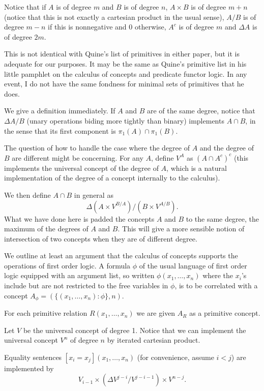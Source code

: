 \documentclass{slides}
\begin{document}
\begin{slide}

Notice that if $A$ is of degree $m$ and $B$ is of degree $n$, $A \times B$ is of degree $m+n$ (notice that this is not exactly 
a cartesian product in the usual sense), $A /B$ is of degree $m-n$ if this is nonnegative and 0 otherwise, $A^c$ is of degree $m$ and $\Delta A$ is of degree $2m$.

This is not identical with Quine's list of primitives in either paper, but it is adequate for our purposes.  It may be the same as Quine's primitive list in his little pamphlet on the calculus of concepts and predicate functor logic.  In any event, I do not have the same fondness for minimal sets of primitives that he does.

\end{slide}

\begin{slide}

We give a definition immediately.  If $A$ and $B$ are of the same degree, notice that $\Delta A/B$ (unary operations biding more tightly than binary) implements $A \cap B$, in the sense that its first component is $\pi_1(A) \cap \pi_1(B)$.

The question of how to handle the case where the degree of $A$ and the degree of $B$ are different might be concerning.  For any $A$, define $V^A$ as
$(A \cap A^c)^c$ (this implements the universal concept of the degree of $A$, which is a natural implementation of the degree of a concept internally to the calculus).

We then define $A \cap B$ in general  as $$\Delta(A \times V^{B/A})/(B \times V^{A/B}).$$  What we have done here is padded the concepts $A$ and $B$ to the same degree,
the maximum of the degrees of $A$ and $B$.  This will give a more sensible notion of intersection of two concepts when they are of different degree.


\end{slide}

\begin{slide}

We outline at least an argument that the calculus of concepts supports the operations of first order logic.  A formula $\phi$ of the usual language of first order logic
equipped with an argument list, so written $\phi(x_1,\ldots,x_n)$ where the $x_i$'s include but are not restricted to the free variables in $\phi$, is to be correlated with a concept $A_\phi = (\{(x_1,\ldots,x_n):\phi\},n)$.

For each primitive relation $R(x_1,\ldots,x_n)$ we are given $A_R$ as a primitive concept.

Let $V$ be the universal concept of degree 1.  Notice that we can implement the universal concept $V^n$ of degree $n$ by iterated cartesian product.

Equality sentences $[x_i=x_j](x_1,\ldots,x_n)$ (for convenience, assume $i < j$) are implemented by $$V_{i-1} \times(\Delta V^{j-i}/V^{j-i-1})\times V^{n-j}.$$

\end{slide}
\end{document}
